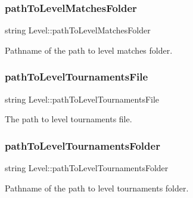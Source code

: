 \subsubsection{\texorpdfstring{path\+To\+Level\+Matches\+Folder}{pathToLevelMatchesFolder}}
{\footnotesize\ttfamily string Level\+::path\+To\+Level\+Matches\+Folder\hspace{0.3cm}{\ttfamily [private]}}



Pathname of the path to level matches folder. 

\hypertarget{class_level_a1c196300430057e2d7d133e85f0c929a}{}\label{class_level_a1c196300430057e2d7d133e85f0c929a} 
\subsubsection{\texorpdfstring{path\+To\+Level\+Tournaments\+File}{pathToLevelTournamentsFile}}
{\footnotesize\ttfamily string Level\+::path\+To\+Level\+Tournaments\+File\hspace{0.3cm}{\ttfamily [private]}}



The path to level tournaments file. 

\hypertarget{class_level_a49f20ede8543a270f763f7253c4247d6}{}\label{class_level_a49f20ede8543a270f763f7253c4247d6} 
\subsubsection{\texorpdfstring{path\+To\+Level\+Tournaments\+Folder}{pathToLevelTournamentsFolder}}
{\footnotesize\ttfamily string Level\+::path\+To\+Level\+Tournaments\+Folder\hspace{0.3cm}{\ttfamily [private]}}



Pathname of the path to level tournaments folder. 

\hypertarget{class_level_a3958021df480857263d65f57c668f5bd}{}\label{class_level_a3958021df480857263d65f57c668f5bd} 
